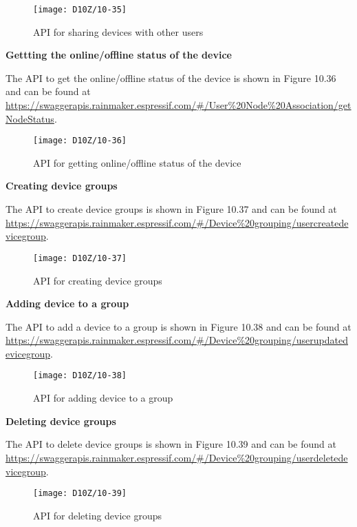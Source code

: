 \documentclass[a4paper,12pt]{book}
\begin{document}
\begin{figure}[ht]
    \centering
    \texttt{[image: D10Z/10-35]}
    \caption{API for sharing devices with other users}
\end{figure}

\textbf{Gettting the online/offline status of the device}

The API to get the online/offline status of the device is shown in Figure 10.36 and can be found at \href{https://swaggerapis.rainmaker.espressif.com/#/User%20Node%20Association/getNodeStatus}{https://swaggerapis.rainmaker.espressif.com/\#/User\%20Node\%20Association/\newline getNodeStatus}.

\begin{figure}[ht]
    \centering
    \texttt{[image: D10Z/10-36]}
    \caption{API for getting online/offline status of the device}
\end{figure}

\textbf{Creating device groups}

The API to create device groups is shown in Figure 10.37 and can be found at \url{https://swaggerapis.rainmaker.espressif.com/\#/Device\%20grouping/usercreatedevicegroup}.

\begin{figure}[ht]
    \centering
    \texttt{[image: D10Z/10-37]}
    \caption{API for creating device groups}
\end{figure}

\textbf{Adding device to a group}

The API to add a device to a group is shown in Figure 10.38 and can be found at \url{https://swaggerapis.rainmaker.espressif.com/\#/Device\%20grouping/userupdatedevicegroup}.

\begin{figure}[ht]
    \centering
    \texttt{[image: D10Z/10-38]}
    \caption{API for adding device to a group}
\end{figure}

\textbf{Deleting device groups}

The API to delete device groups is shown in Figure 10.39 and can be found at \url{https://swaggerapis.rainmaker.espressif.com/\#/Device\%20grouping/userdeletedevicegroup}.

\begin{figure}[ht]
    \centering
    \texttt{[image: D10Z/10-39]}
    \caption{API for deleting device groups}
\end{figure}
\end{document}

